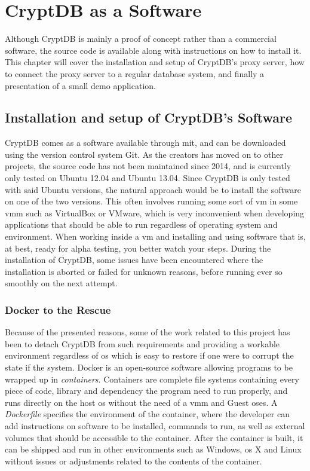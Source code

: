 \chapter{CryptDB as a Software}
\label{chp:software}

Although CryptDB is mainly a proof of concept rather than a commercial software, the source code is available along with instructions on how to install it. This chapter will cover the installation and setup of CryptDB's proxy server, how to connect the proxy server to a regular database system, and finally a presentation of a small demo application.

\section{Installation and setup of CryptDB's Software}

CryptDB comes as a software available through \gls{mit}, and can be downloaded using the version control system Git. As the creators has moved on to other projects, the source code has not been maintained since 2014, and is currently only tested on Ubuntu 12.04 and Ubuntu 13.04. Since CryptDB is only tested with said Ubuntu versions, the natural approach would be to install the software on one of the two versions. This often involves running some sort of \gls{vm} in some \gls{vmm} such as VirtualBox or VMware, which is very inconvenient when developing applications that should be able to run regardless of operating system and environment. When working inside a \gls{vm} and installing and using software that is, at best, ready for alpha testing, you better watch your steps. During the installation of CryptDB, some issues have been encountered where the installation is aborted or failed for unknown reasons, before running ever so smoothly on the next attempt.


\subsection{Docker to the Rescue}


Because of the presented reasons, some of the work related to this project has been to detach CryptDB from such requirements and providing a workable environment regardless of \gls{os} which is easy to restore if one were to corrupt the state if the system. Docker \cite{docker_homepage} is an open-source software allowing programs to be wrapped up in \emph{containers}. Containers are complete file systems containing every piece of code, 
library and dependency the program need to run properly, and runs directly on the host \gls{os} without the need of a \gls{vmm} and Guest \gls{os}es. A \emph{Dockerfile} specifies the environment of the container, where the developer can add instructions on software to be installed, commands to run, as well as external volumes that should be accessible to the container. After the container is built, it can be shipped and run in other environments such as Windows, \gls{os} X and Linux without issues or adjustments related to the contents of the container.

